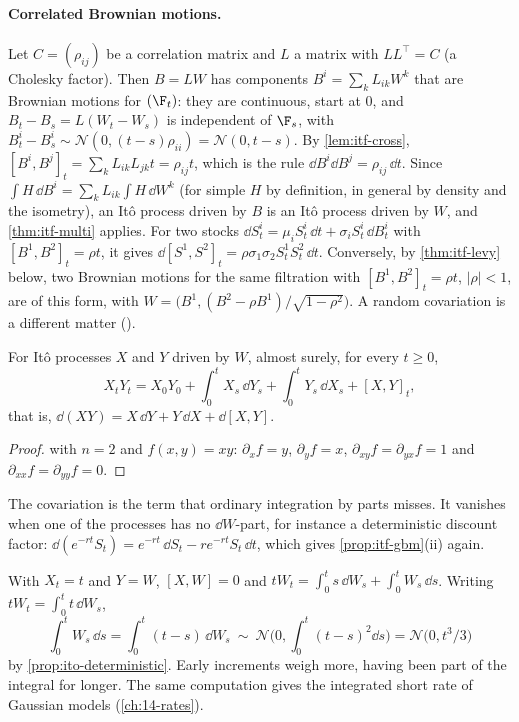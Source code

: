 \paragraph{Correlated Brownian motions.} Let $C=(\rho_{ij})$ be a correlation matrix and $L$ a matrix
with $LL^\top=C$ (a Cholesky factor). Then $B=LW$ has components $B^i=\sum_kL_{ik}W^k$ that are
Brownian motions for $(\F_t)$: they are continuous, start at $0$, and $B_t-B_s=L(W_t-W_s)$ is
independent of $\F_s$, with $B^i_t-B^i_s\sim\mathcal N(0,(t-s)\rho_{ii})=\mathcal N(0,t-s)$. By
\cref{lem:itf-cross}, $[B^i,B^j]_t=\sum_kL_{ik}L_{jk}t=\rho_{ij}t$, which is the rule
$\dd B^i\dd B^j=\rho_{ij}\,\dd t$. Since $\int H\,\dd B^i=\sum_kL_{ik}\int H\,\dd W^k$ (for simple $H$
by definition, in general by density and the isometry), an It\^o process driven by $B$ is an It\^o
process driven by $W$, and \cref{thm:itf-multi} applies. For two stocks
$\dd S^i_t=\mu_iS^i_t\,\dd t+\sigma_iS^i_t\,\dd B^i_t$ with $[B^1,B^2]_t=\rho t$, it gives
$\dd[S^1,S^2]_t=\rho\sigma_1\sigma_2S^1_tS^2_t\,\dd t$. Conversely, by \cref{thm:itf-levy} below, two
Brownian motions for the same filtration with $[B^1,B^2]_t=\rho t$, $|\rho|<1$, are of this form,
with $W=\big(B^1,(B^2-\rho B^1)/\sqrt{1-\rho^2}\big)$. A random covariation is a different matter
().

\begin{corollary}\label{cor:itf-product}
For It\^o processes $X$ and $Y$ driven by $W$, almost surely, for every $t\ge0$,
\[
  X_tY_t=X_0Y_0+\int_0^tX_s\,\dd Y_s+\int_0^tY_s\,\dd X_s+[X,Y]_t,
\]
that is, $\dd(XY)=X\,\dd Y+Y\,\dd X+\dd[X,Y]$.
\end{corollary}

\begin{proof}
 with $n=2$ and $f(x,y)=xy$: $\partial_xf=y$, $\partial_yf=x$,
$\partial_{xy}f=\partial_{yx}f=1$ and $\partial_{xx}f=\partial_{yy}f=0$.
\end{proof}

The covariation is the term that ordinary integration by parts misses. It vanishes when one of the
processes has no $\dd W$-part, for instance a deterministic discount factor:
$\dd(e^{-rt}S_t)=e^{-rt}\,\dd S_t-re^{-rt}S_t\,\dd t$, which gives \cref{prop:itf-gbm}(ii) again.

\begin{example}\label{exa:itf-product}
With $X_t=t$ and $Y=W$, $[X,W]=0$ and $tW_t=\int_0^ts\,\dd W_s+\int_0^tW_s\,\dd s$. Writing
$tW_t=\int_0^tt\,\dd W_s$,
\[
  \int_0^tW_s\,\dd s=\int_0^t(t-s)\,\dd W_s\ \sim\ \mathcal N\Big(0,\int_0^t(t-s)^2\dd s\Big)=\mathcal N\big(0,t^3/3\big)
\]
by \cref{prop:ito-deterministic}. Early increments weigh more, having been part of the integral for
longer. The same computation gives the integrated short rate of Gaussian models (\cref{ch:14-rates}).
\end{example}

